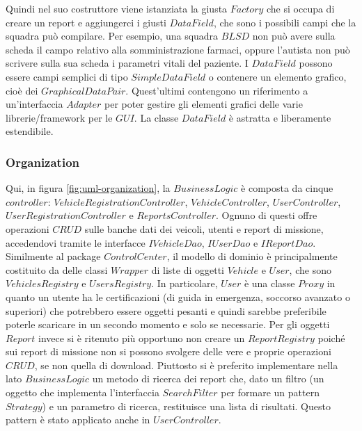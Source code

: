 \documentclass{article}
\begin{document}
    Quindi nel suo costruttore viene istanziata la giusta $Factory$ che si occupa di creare un report e aggiungerci i giusti $DataField$, che sono i possibili campi che la squadra può compilare.
    Per esempio, una squadra $BLSD$ non può avere sulla scheda il campo relativo alla somministrazione farmaci, oppure l'autista non può scrivere sulla sua scheda i parametri vitali del paziente.
    I $DataField$ possono essere campi semplici di tipo $SimpleDataField$ o contenere un elemento grafico, cioè dei $GraphicalDataPair$.
    Quest'ultimi contengono un riferimento a un'interfaccia $Adapter$ per poter gestire gli elementi grafici delle varie librerie/framework per le $GUI$.
    La classe $DataField$ è astratta e liberamente estendibile.

    \subsubsection{Organization}
    Qui, in figura \ref{fig:uml-organization}, la $BusinessLogic$ è composta da cinque $controller$: $VehicleRegistrationController$, $VehicleController$, $UserController$, $UserRegistrationController$ e $ReportsController$.
    Ognuno di questi offre operazioni $CRUD$ sulle banche dati dei veicoli, utenti e report di missione, accedendovi tramite le interfacce $IVehicleDao$, $IUserDao$ e $IReportDao$.
    Similmente al package $ControlCenter$, il modello di dominio è principalmente costituito da delle classi $Wrapper$ di liste di oggetti $Vehicle$ e $User$, che sono $VehiclesRegistry$ e $UsersRegistry$.
    In particolare, $User$ è una classe $Proxy$ in quanto un utente ha le certificazioni (di guida in emergenza, soccorso avanzato o superiori) che potrebbero essere oggetti pesanti e quindi sarebbe preferibile poterle scaricare in un secondo momento e solo se necessarie.
    \newline Per gli oggetti $Report$ invece si è ritenuto più opportuno non creare un $ReportRegistry$ poiché sui report di missione non si possono svolgere delle vere e proprie operazioni $CRUD$, se non quella di download.
    Piuttosto si è preferito implementare nella lato $BusinessLogic$ un metodo di ricerca dei report che, dato un filtro (un oggetto che implementa l'interfaccia $SearchFilter$ per formare un pattern $Strategy$) e un parametro di ricerca, restituisce una lista di risultati.
    Questo pattern è stato applicato anche in $UserController$.
\end{document}
